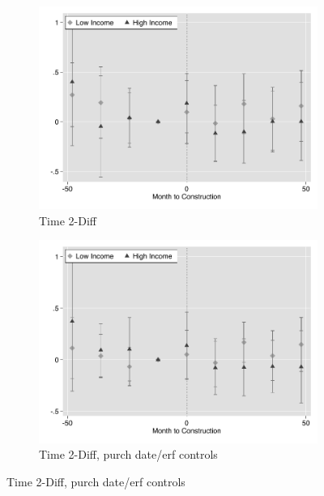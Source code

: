 \documentclass[12pt]{article}
\begin{document}
\begin{figure}
\begin{subfigure}[b]{0.48\textwidth}
        \end{subfigure}
        \begin{subfigure}[b]{0.48\textwidth}
                    \caption[Network2]%
            {{\footnotesize Time 2-Diff}}    
            \label{fig:prefor}
            \centering
            \includegraphics[width=\textwidth,trim={0.3cm .3cm 0.1cm 0cm}, clip=true]{figures/price_time_2d_no_ctrl}
        \end{subfigure}
        \hfill
        \begin{subfigure}[b]{0.48\textwidth}
                    \caption[Network2]%
            {{\footnotesize Time 2-Diff, purch date/erf controls}}    
            \label{fig:prefor}
            \centering
            \includegraphics[width=\textwidth,trim={0.3cm .3cm 0.1cm 0cm}, clip=true]{figures/price_time_2d_ctrl}
        \end{subfigure}
\end{figure}
\end{document}
